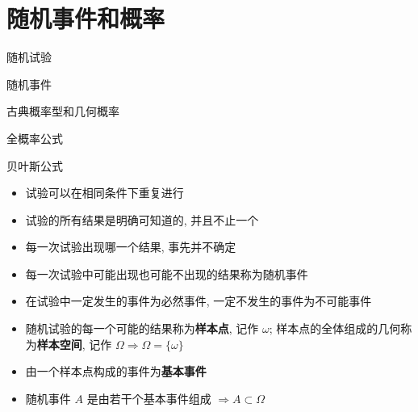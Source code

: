 \chapter{随机事件和概率}
\begin{introduction}
	\item 随机试验
	\item 随机事件
	\item 古典概率型和几何概率
	\item 全概率公式
	\item 贝叶斯公式
\end{introduction}

\begin{definition}[随机试验]
	\begin{itemize}
		\item 试验可以在相同条件下重复进行
		\item 试验的所有结果是明确可知道的, 并且不止一个
		\item 每一次试验出现哪一个结果, 事先并不确定
	\end{itemize}
\end{definition}
\begin{definition}[随机事件]
	\begin{itemize}
		\item 每一次试验中可能出现也可能不出现的结果称为随机事件
		\item 在试验中一定发生的事件为必然事件, 一定不发生的事件为不可能事件
	\end{itemize}
\end{definition}

\begin{definition}[样本空间]
	\begin{itemize}
		\item 随机试验的每一个可能的结果称为\textbf{样本点}, 记作 $\omega$; 样本点的全体组成的几何称为\textbf{样本空间}, 记作 
		$\Omega\Rightarrow \Omega = \{\omega\}$
		\item 由一个样本点构成的事件为\textbf{基本事件}
		\item 随机事件 $A$ 是由若干个基本事件组成 $\Rightarrow A \subset \Omega$
	\end{itemize}
\end{definition}

